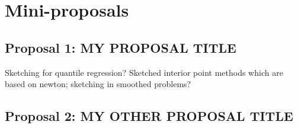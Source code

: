 

\section{Mini-proposals}

\subsection{Proposal 1: MY PROPOSAL TITLE} %

\todo Sketching for quantile regression? Sketched interior point methods which are based on newton; sketching in smoothed problems?


\subsection{Proposal 2: MY OTHER PROPOSAL TITLE} %

